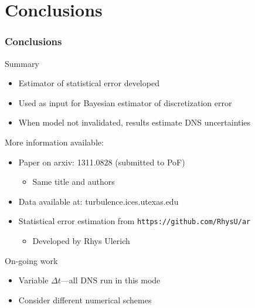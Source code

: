 \documentclass[mathserif]{beamer}
\begin{document}
\section{Conclusions}
\begin{frame}
\frametitle{Conclusions}

 \begin{block}{Summary}
  \begin{itemize}
   \item Estimator of statistical error developed
   \item Used as input for Bayesian estimator of discretization error
   \item When model not invalidated, results estimate DNS uncertainties
  \end{itemize}
 \end{block}

 \begin{block}{More information available:}
  \begin{itemize}
   \item Paper on arxiv: 1311.0828 (submitted to PoF)
	 \begin{itemize}			       
	  \item Same title and authors
	 \end{itemize}
   \item Data available at: turbulence.ices.utexas.edu
   \item Statistical error estimation from \texttt{https://github.com/RhysU/ar}
   \begin{itemize}
    \item Developed by Rhys Ulerich
   \end{itemize}	 
  \end{itemize}
 \end{block}

 \begin{block}{On-going work}
  \begin{itemize}
   \item Variable $\Delta t$---all DNS run in this mode
   \item Consider different numerical schemes
  \end{itemize}
 \end{block}

\end{frame}
 
\end{document}
